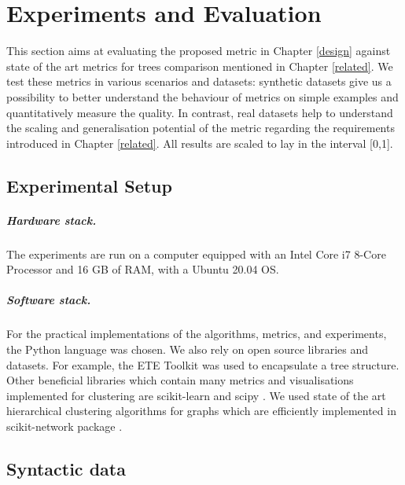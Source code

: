 \chapter{Experiments and Evaluation}
\label{experiments}

This section aims at evaluating the proposed metric in Chapter \ref{design} against state of the art metrics for trees comparison mentioned in Chapter \ref{related}. We test these metrics in various scenarios and datasets: synthetic datasets give us a possibility to better understand the behaviour of metrics on simple examples and quantitatively measure the quality. In contrast, real datasets help to understand the scaling and generalisation potential of the metric regarding the requirements introduced in Chapter \ref{related}. All results are scaled to lay in the interval [0,1].

%

\section{Experimental Setup}
\paragraph{Hardware stack.}The experiments are run on a computer equipped with an Intel Core i7 8-Core Processor and 16 GB of RAM, with a Ubuntu 20.04 OS.

\paragraph{Software stack.}For the practical implementations of the algorithms, metrics, and experiments, the Python language was chosen. We also rely on open source libraries and datasets. For example, the ETE Toolkit \cite{ete3} was used to encapsulate a tree structure. Other beneficial libraries which contain many metrics and visualisations implemented for clustering are scikit-learn \cite{scikit-learn} and scipy \cite{2020SciPy}. We used state of the art hierarchical clustering algorithms for graphs which are efficiently implemented in scikit-network package \cite{scikit-network}.    
\section{Syntactic data}

